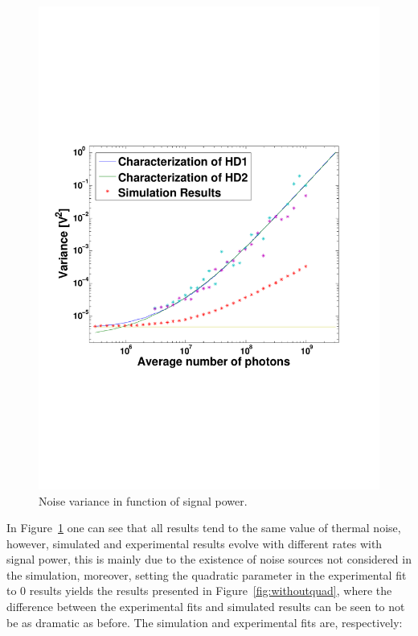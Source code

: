 \documentclass[a4paper]{article}
\begin{document}
\begin{figure}[h]
\centering
\includegraphics[width=\linewidth, trim= 0mm 60mm 0mm 70mm]{simulationresults1.pdf}
\caption{Noise variance in function of signal power.}
\label{fig:withquad}
\end{figure}

In Figure~\ref{fig:withquad} one can see that all results tend to the same value of thermal noise, however, simulated and experimental results evolve with different rates with signal power, this is mainly due to the existence of noise sources not considered in the simulation, moreover, setting the quadratic parameter in the experimental fit to 0 results yields the results presented in Figure~\ref{fig:withoutquad}, where the difference between the experimental fits and simulated results can be seen to not be as dramatic as before. The simulation and experimental  fits are, respectively:
\end{document}
